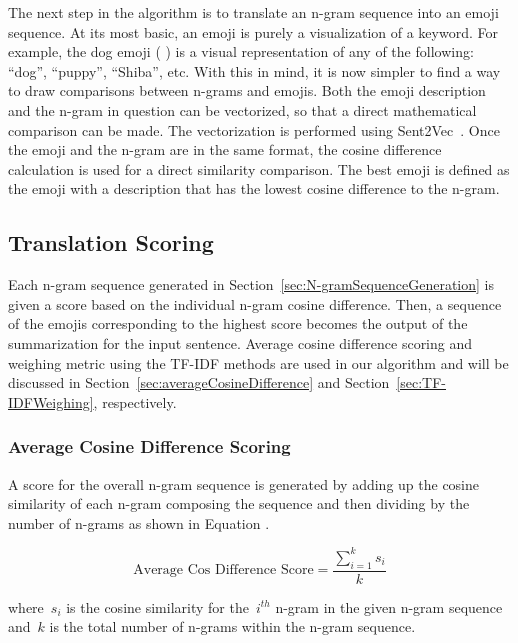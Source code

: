 \documentclass{article}[10]
\newcommand*{\img}[1]{%
  \raisebox{-.3\baselineskip}{%
    \texttt{[image: \#1]}%
  }%
}
\begin{document}
The next step in the algorithm is to translate an n-gram sequence into
an emoji sequence. At its most basic, an emoji is purely a visualization
of a keyword. For example, the dog emoji (\img{emojis/1f415.png}) is a visual representation
of any of the following: ``dog'', ``puppy'', ``Shiba'', etc. With this
in mind, it is now simpler to find a way to draw comparisons between
n-grams and emojis. Both the emoji description and the n-gram in
question can be vectorized, so that a direct mathematical comparison can
be made. The vectorization is performed using
Sent2Vec~\cite{pg2017unsu}. Once the emoji and the n-gram are in the
same format, the cosine difference calculation is used for a direct
similarity comparison. The best emoji is defined as the emoji with a
description that has the lowest cosine difference to the n-gram.

\subsection{Translation Scoring\label{sec:translationScoring}}

Each n-gram sequence generated in
Section~\ref{sec:N-gramSequenceGeneration} is given a score based on the
individual n-gram cosine difference. Then, a sequence of the emojis
corresponding to the highest score becomes the output of the
summarization for the input sentence. Average cosine difference scoring
and weighing metric using the TF-IDF methods are used in our algorithm
and will be discussed in Section~\ref{sec:averageCosineDifference} and
Section~\ref{sec:TF-IDFWeighing}, respectively.

\subsubsection{Average Cosine Difference Scoring\label{sec:averageCosineDifference}}

A score for the overall n-gram sequence is generated by adding up the
cosine similarity of each n-gram composing the sequence and then
dividing by the number of n-grams as shown in Equation .

\begin{equation}
   \textrm{Average Cos Difference Score} = \frac{\sum_{i=1}^{k}s_{i}}{k} \label{eq:averageCosineDifference}
\end{equation}

where~\(s_{i}\) is the cosine similarity for
the~\(i^{th}\) n-gram in the given n-gram sequence
and~\(k\) is the total number of n-grams within the n-gram
sequence.
\end{document}
